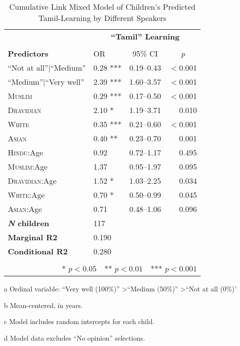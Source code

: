 \begin{table*}[t]
\small
\caption{Cumulative Link Mixed Model of Children's Predicted Tamil-Learning by Different Speakers}\label{tab:tamil-ord}
    \centering
    \vspace{5pt}
\begin{threeparttable}
\begin{tabular}{llcr}
 \toprule
& \multicolumn{3}{c}{\textbf{``Tamil'' Learning}\tnote{a}} \\
\cline{2-4} \\[-.75em]
\textbf{Predictors} & {OR} & {95\% CI} & \multicolumn{1}{c}{\textit{p}} \\ 
\midrule
  \hline
``Not at all''$|$``Medium'' & 0.28 *** & 0.19--0.43 & $<$0.001 \\ 
``Medium''$|$``Very well'' & 2.39 *** & 1.60--3.57 & $<$0.001 \\ 
  \textsc{Muslim} & 0.29 *** & 0.17--0.50 & $<$0.001 \\ 
  \textsc{Dravidian} & 2.10 * & 1.19--3.71 & 0.010 \\ 
  \textsc{White} & 0.35 *** & 0.21--0.60 & $<$0.001 \\ 
  \textsc{Asian} & 0.40 ** & 0.23--0.70 & 0.001 \\ 
\textsc{Hindu}:Age\tnote{b}  & 0.92 & 0.72--1.17 & 0.495 \\ 
  \textsc{Muslim}:Age & 1.37 & 0.95--1.97 & 0.095 \\ 
  \textsc{Dravidian}:Age & 1.52 * & 1.03--2.25 & 0.034 \\ 
  \textsc{White}:Age & 0.70 * & 0.50--0.99 & 0.045 \\ 
  \textsc{Asian}:Age & 0.71 & 0.48--1.06 & 0.096 \\ 
\midrule
\bfseries{\textit{N} children}\tnote{c} & 117 &  &  \\ 
 \textbf{Marginal R2} & 0.190 && \\ 
 \textbf{Conditional R2} & 0.280 &  &  \\
\bottomrule\\[-.75em]
\multicolumn{4}{r}{* $p<0.05$~~** $p<0.01$~~*** $p<0.001$}\\
\end{tabular}
\begin{tablenotes}[flushleft]
    \item[a] Ordinal variable: ``Very well (100\%)'' \textgreater ``Medium (50\%)'' \textgreater ``Not at all (0\%)'
    \item[b] Mean-centered, in years.
    \item[c] Model includes random intercepts for each child.
    \item[d] Model data excludes ``No opinion'' selections. 
\end{tablenotes}
\end{threeparttable}
\end{table*}